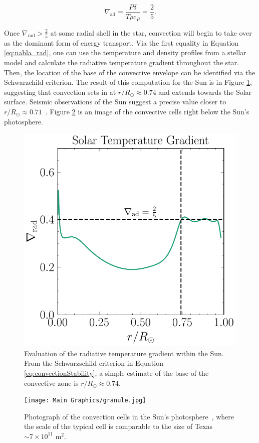 \documentclass[12pt]{article}
\begin{document}
\begin{equation}
    \nabla_\mathrm{ad} = \frac{P\delta}{T\rho c_P} = \frac{2}{5}. \label{eq:0.4}
\end{equation}

Once $\nabla_\mathrm{rad} > \frac{2}{5}$ at some radial shell in the star, convection will begin to take over as the dominant form of energy transport. Via the first equality in Equation \ref{eq:nabla_rad}, one can use the temperature and density profiles from a stellar model and calculate the radiative temperature gradient throughout the star. Then, the location of the base of the convective envelope can be identified via the Schwarzchild criterion. The result of this computation for the Sun is in Figure \ref{fig:nabla_rad}, suggesting that convection sets in at $r/R_\odot \approx 0.74$ and extends towards the Solar surface. Seismic observations of the Sun suggest a precise value closer to $r/R_\odot \approx 0.71$~\cite{convectiveZone}. Figure \ref{fig:texas} is an image of the convective cells right below the Sun's photosphere.

\begin{figure}
    \centering
    \includegraphics[width=0.5\linewidth]{Solar Model Images/nabla_rad.pdf}
    \caption{Evaluation of the radiative temperature gradient within the Sun. From the Schwarzschild criterion in Equation \ref{eq:convectionStability}, a simple estimate of the base of the convective zone is $r/R_\odot \approx 0.74$.}
    \label{fig:nabla_rad}
\end{figure}

\begin{figure}
    \centering
    \texttt{[image: Main Graphics/granule.jpg]}
    \caption{Photograph of the convection cells in the  Sun's photosphere~\cite{NSF_2020}, where the scale of the typical cell is comparable to the size of Texas $\sim 7\times10^{11}$ m$^2$.}
    \label{fig:texas}
\end{figure}
\end{document}
